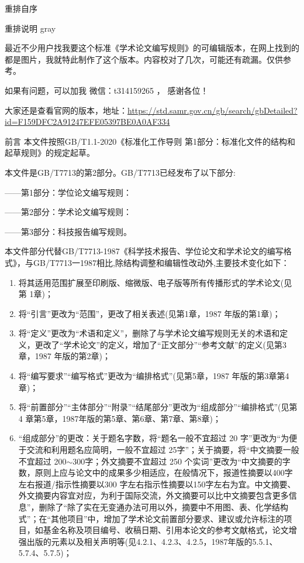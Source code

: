 \begin{preamble}{重排自序}
\begin{mybox}{重排说明 }{gray}

最近不少用户找我要这个标准《学术论文编写规则》的可编辑版本，在网上找到的都是图片，我就特此制作了这个版本。内容校对了几次，可能还有疏漏。仅供参考。

如果有问题，可以加我 微信：t314159265 ， 感谢各位！

大家还是查看官网的版本，地址：\url{https://std.samr.gov.cn/gb/search/gbDetailed?id=F159DFC2A91247EFE05397BE0A0AF334}

\end{mybox}
\end{preamble}

\begin{preamble}{前言}
  本文件按照GB/T1.1-2020《标准化工作导则 第1部分：标准化文件的结构和起草规则》的规定起草。

本文件是GB/T7713的第2部分。GB/T7713已经发布了以下部分:

——第1部分：学位论文编写规则：

——第2部分：学术论文编写规则：

——第3部分：科技报告编写规则。

本文件部分代替GB/T7713-1987《科学技术报告、学位论文和学术论文的编写格式》，与GB/T7713一1987相比,除结构调整和编辑性改动外,主要技术变化如下：

\begin{enumerate}[label={\alph*）}]
  \item
 将其适用范围扩展至印刷版、缩微版、电子版等所有传播形式的学术论文(见第 1章)；

  \item   将“引言”更改为“范围”，更改了相关表述(见第1章，1987 年版的第1章)；

  \item   将“定义”更改为“术语和定义”，删除了与学术论文编写规则无关的术语和定义，更改了“学术论文”的定义，增加了“正文部分”“参考文献”的定义(见第3章，1987 年版的第2章)；

  \item  将“编写要求”“编写格式”更改为“编排格式”(见第5章，1987 年版的第3章第4章)；

  \item  将“前置部分”“主体部分”“附录”“结尾部分”更改为“组成部分”“编排格式”(见第 4 章第5章，1987年版的第5章、第6章、第7章、第8章)；

  \item  “组成部分”的更改：关于题名字数，将“题名一般不宜超过 20 字”更改为“为便于交流和利用题名应简明，一般不宜超过 25字”；关于摘要，将“中文摘要一般不宜超过 200$\sim$300字；外文摘要不宜超过 250 个实词”更改为“中文摘要的字数，原则上应与论文中的成果多少相适应，在般情况下，报道性摘要以400字左右报道/指示性摘要以300 字左右指示性摘要以150字左右为宜。中文摘要、外文摘要内容宜对应，为利于国际交流，外文摘要可以比中文摘要包含更多信息”，删除了“除了实在无变通办法可用以外，摘要中不用图、表、化学结构式”；在“其他项目”中，增加了学术论文前置部分要求、建议或允许标注的项目，如基金名称及项目编号、收稿日期、引用本论文的参考文献格式，论文增强出版的元素以及相关声明等(见4.2.1、4.2.3、4.2.5，1987年版的5.5.1、5.7.4、5.7.5)；


\end{enumerate}
\end{preamble}
